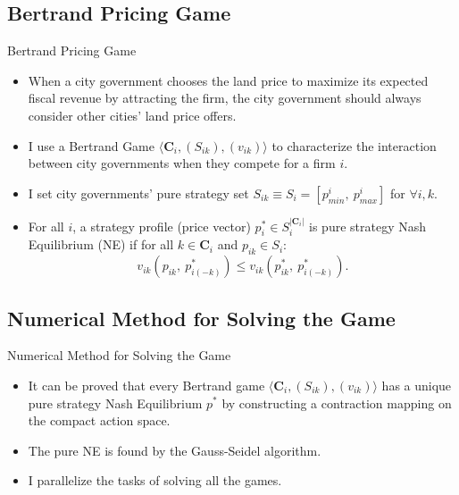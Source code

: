 \documentclass[xcolor={dvipsnames}]{beamer}
\theoremstyle{plain}
\begin{document}
\subsection{Bertrand Pricing Game}
\begin{frame}{Bertrand Pricing Game}
    \begin{itemize}
        \item When a city government chooses the land price to
              maximize its expected fiscal revenue by attracting the firm,
              the city government should always consider other cities' land price offers.
        \item I use a Bertrand Game $\langle \mathbf{C}_{i}, (S_{ik}), (v_{ik}) \rangle$
              to characterize the interaction between city governments
              when they compete for a firm $i$.
        \item I set city governments' pure strategy set $S_{ik}
                  \equiv S_{i} =  [p^{i}_{min}, ~p^{i}_{max}]$
              for $\forall i, k$.
        \item For all $i$, a strategy profile (price vector) $p^{*}_{i} \in S_{i}^{|\mathbf{C}_i|}$
              is pure strategy
              Nash Equilibrium (NE) if for
              all $k \in \mathbf{C}_i$ and $p_{ik} \in S_i$:
              \useshortskip
              \begin{equation*}
                  v_{ik}(p_{ik}, ~p^{*}_{i(-k)}) \leq v_{ik}(p^{*}_{ik}, ~p^{*}_{i(-k)}).
              \end{equation*}
    \end{itemize}

\end{frame}

\subsection{Numerical Method for Solving the Game}
\begin{frame}{Numerical Method for Solving the Game}
    \begin{itemize}
        \item It can be proved that every Bertrand game $\langle \mathbf{C}_{i}, (S_{ik}), (v_{ik}) \rangle$
              has a unique pure strategy Nash Equilibrium $p^{*}$ by constructing a contraction mapping on
              the compact action space.
        \item The pure NE is found by the Gauss-Seidel algorithm.
        \item I parallelize the tasks of solving all the games.
    \end{itemize}
\end{frame}
\end{document}

